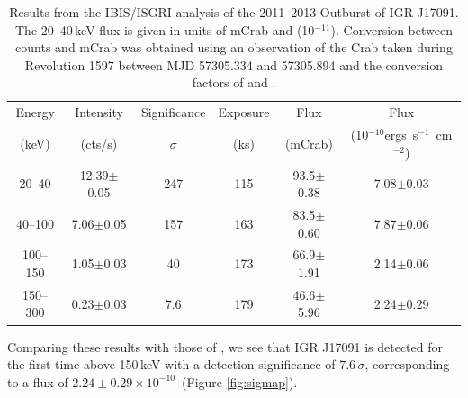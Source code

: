 \begin{table}
\begin{tabular}{cccccc}
\hline
\hline
Energy 		& Intensity 		& Significance 	& Exposure 	& Flux 				& Flux					\\
(keV)		& (cts/s)			& $\sigma$		& (ks)		& (mCrab) 			& (10$^{-10}$ergs~s$^{-1}$~cm$^{-2}$) 	\\
\hline
20--40		& 12.39$\pm$0.05	& 247			& 115		& 93.5$\pm$0.38		& 7.08$\pm$0.03			\\
40--100		& 7.06$\pm$0.05		& 157			& 163		& 83.5$\pm$0.60		& 7.87$\pm$0.06			\\
100--150	& 1.05$\pm$0.03		& 40			& 173		& 66.9$\pm$1.91		& 2.14$\pm$0.06			\\
150--300	& 0.23$\pm$0.03		& 7.6			& 179		& 46.6$\pm$5.96		& 2.24$\pm$0.29			\\	
\hline
\hline
\end{tabular}
\caption[Results from the IBIS/ISGRI analysis of the 2011--2013 Outburst of IGR J17091.]{Results from the IBIS/ISGRI analysis of the 2011--2013 Outburst of IGR J17091. The 20--40\,keV flux is given in units of mCrab and (10$^{-11}$\ergf ). Conversion between counts and mCrab was obtained using an observation of the Crab taken during Revolution 1597 between MJD 57305.334 and 57305.894 and the conversion factors of \citet{Bird_Survey} and \citet{Bazzano_Survey}.}
\label{tab:IBIS_results}
\end{table}

\par Comparing these results with those of \citet{Bazzano_Survey}, we see that IGR J17091 is detected for the first time above 150\,keV with a detection significance of 7.6\,$\sigma$, corresponding to a flux of $2.24\pm0.29\times10^{-10}$\ergf\ (Figure \ref{fig:sigmap}).

